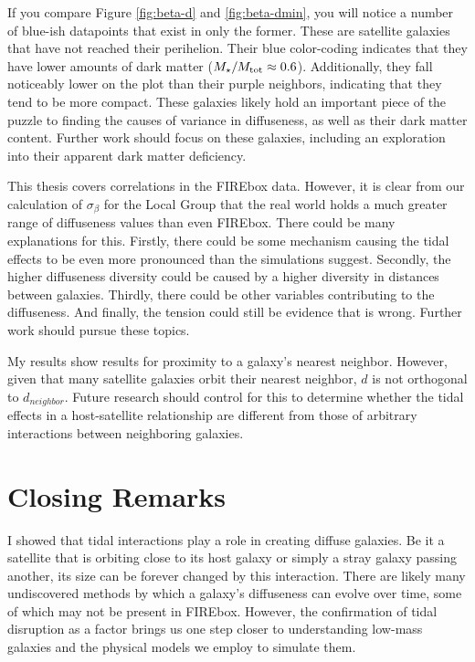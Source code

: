 If you compare Figure \ref{fig:beta-d} and \ref{fig:beta-dmin}, you will notice a number of blue-ish datapoints that exist in only the former. These are satellite galaxies that have not reached their perihelion. Their blue color-coding indicates that they have lower amounts of dark matter ($M_\star / M_{\rm{tot}} \approx 0.6$). Additionally, they fall noticeably lower on the plot than their purple neighbors, indicating that they tend to be more compact. These galaxies likely hold an important piece of the puzzle to finding the causes of variance in diffuseness, as well as their dark matter content. Further work should focus on these galaxies, including an exploration into their apparent dark matter deficiency.

This thesis covers correlations in the FIREbox data. However, it is clear from our calculation of $\sigma_\beta$ for the Local Group that the real world holds a much greater range of diffuseness values than even FIREbox. There could be many explanations for this. Firstly, there could be some mechanism causing the tidal effects to be even more pronounced than the simulations suggest. Secondly, the higher diffuseness diversity could be caused by a higher diversity in distances between galaxies. Thirdly, there could be other variables contributing to the diffuseness. And finally, the tension could still be evidence that \lcdm\* is wrong. Further work should pursue these topics.

My results show results for proximity to a galaxy's nearest neighbor. However, given that many satellite galaxies orbit their nearest neighbor, $d$ is not orthogonal to $d_{neighbor}$. Future research should control for this to determine whether the tidal effects in a host-satellite relationship are different from those of arbitrary interactions between neighboring galaxies.

\section{Closing Remarks}

I showed that tidal interactions play a role in creating diffuse galaxies. Be it a satellite that is orbiting close to its host galaxy or simply a stray galaxy passing another, its size can be forever changed by this interaction. There are likely many undiscovered methods by which a galaxy's diffuseness can evolve over time, some of which may not be present in FIREbox. However, the confirmation of tidal disruption as a factor brings us one step closer to understanding low-mass galaxies and the physical models we employ to simulate them.